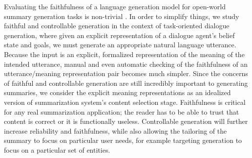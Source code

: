 Evaluating the faithfulness of a language generation model for open-world
summary generation tasks is non-trivial \citep{kryscinski2020,maynez2020}. In
order to simplify things, we study faithful and controllable generation in the
context of task-oriented dialogue generation, where given an explicit
representation of a dialogue agent's belief state and goals, we must generate
an appropriate natural language utterance. Because the input is an explicit,
formalized representation of the meaning of the intended utterance, manual and
even automatic checking of the faithfulness of an utterance/meaning
representation pair becomes much simpler. Since the concerns of faithful and
controllable generation are still incredibly important to generating
summaries, we consider the explicit meaning representations as an idealized
version of summarization system's content selection stage.  Faithfulness is
critical for any real summarization application; the reader has to be able to
trust that content is correct or it is functionally useless. Controllable
generation will further increase reliability and faithfulness, while
also allowing the tailoring of the summary to focus on particular
user needs, for example targeting generation to focus on a particular set of
entities. 
      
      
      

